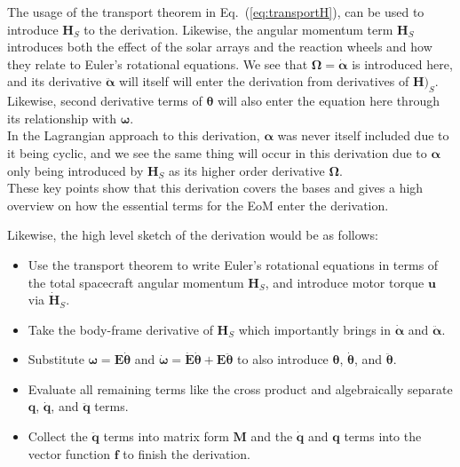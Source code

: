 \documentclass[titlepage]{article}
\begin{document}
The usage of the transport theorem in Eq.~(\ref{eq:transportH}), can be used to introduce $\boldsymbol{H}_S$ to the derivation. Likewise, the angular momentum term $\boldsymbol{H}_S$ introduces both the effect of the solar arrays and the reaction wheels and how they relate to Euler's rotational equations. We see that $\boldsymbol{\Omega}=\dot{\boldsymbol{\alpha}}$ is introduced here, and its derivative $\ddot{\boldsymbol{\alpha}}$ will itself will enter the derivation from derivatives of $\boldsymbol{H})_S$. Likewise, second derivative terms of $\boldsymbol{\theta}$ will also enter the equation here through its relationship with $\boldsymbol{\omega}$. \\

In the Lagrangian approach to this derivation, $\boldsymbol{\alpha}$ was never itself included due to it being cyclic, and we see the same thing will occur in this derivation due to $\boldsymbol{\alpha}$ only being introduced by $\boldsymbol{H}_S$ as its higher order derivative $\boldsymbol{\Omega}$.\\

These key points show that this derivation covers the bases and gives a high overview on how the essential terms for the EoM enter the derivation.

\begin{mdframed}
	Likewise, the high level sketch of the derivation would be as follows:
	\begin{itemize}
		\item Use the transport theorem to write Euler's rotational equations in terms of the total spacecraft angular momentum $\boldsymbol{H}_S$, and introduce motor torque $\boldsymbol{u}$ via $\dot{\boldsymbol{H}}_S$.
		\item Take the body-frame derivative of $\boldsymbol{H}_S$ which importantly brings in $\dot{\boldsymbol{\alpha}}$ and $\ddot{\boldsymbol{\alpha}}$.
		\item Substitute $\boldsymbol{\omega}=\boldsymbol{E}\dot{\boldsymbol{\theta}}$ and $\dot{\boldsymbol{\omega}}=\dot{\boldsymbol{E}}\dot{\boldsymbol{\theta}}+\boldsymbol{E}\ddot{\boldsymbol{\theta}}$ to also introduce $\boldsymbol{\theta}$, $\dot{\boldsymbol{\theta}}$, and $\ddot{\boldsymbol{\theta}}$.
		\item Evaluate all remaining terms like the cross product and algebraically separate $\boldsymbol{q}$, $\dot{\boldsymbol{q}}$, and $\ddot{\boldsymbol{q}}$ terms.
		\item Collect the $\ddot{\boldsymbol{q}}$ terms into matrix form $\boldsymbol{M}$ and the $\dot{\boldsymbol{q}}$ and $\boldsymbol{q}$ terms into the vector function $\boldsymbol{f}$ to finish the derivation.
	\end{itemize}
\end{mdframed}
\end{document}
